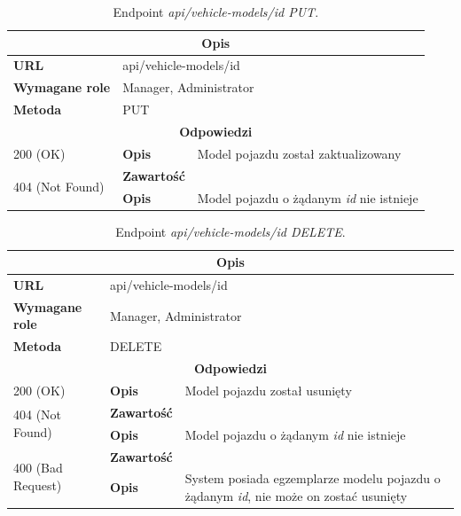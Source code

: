 \documentclass[eng,printmode,openany]{mgr}
\begin{document}
\begin{table}[H]
	\caption{Endpoint \textit{api/vehicle-models/id PUT}.}
	\begin{tabularx}{\textwidth}{|l|l|X|}
		\hline
		\multicolumn{3}{|c|}{\textbf{\textbf{Opis}}}
		\\ \hline
		\textbf{URL}                       & \multicolumn{2}{l|}{api/vehicle-models/id}
		\\ \hline
		\textbf{Wymagane role}             & \multicolumn{2}{l|}{Manager, Administrator}
		\\ \hline
		\textbf{Metoda}                    & \multicolumn{2}{l|}{PUT}
		\\ \hline
		\multicolumn{3}{|c|}{\textbf{Odpowiedzi}}
		\\ \hline
		200 (OK) 		 & \textbf{Opis}      	& Model pojazdu został zaktualizowany
		\\ \hline
		\multirow{2}{*}{404 (Not Found)} 	    & \textbf{Zawartość}     &   
		\\ \cline{2-3}                          & \textbf{Opis}          & Model pojazdu o żądanym \textit{id} nie istnieje
		\\ \hline
	\end{tabularx}
\end{table}

\begin{table}[H]
	\caption{Endpoint \textit{api/vehicle-models/id DELETE}.}
	\begin{tabularx}{\textwidth}{|l|l|X|}
		\hline
		\multicolumn{3}{|c|}{\textbf{\textbf{Opis}}}
		\\ \hline
		\textbf{URL}                       & \multicolumn{2}{l|}{api/vehicle-models/id}
		\\ \hline
		\textbf{Wymagane role}             & \multicolumn{2}{l|}{Manager, Administrator}
		\\ \hline
		\textbf{Metoda}                    & \multicolumn{2}{l|}{DELETE}
		\\ \hline
		\multicolumn{3}{|c|}{\textbf{Odpowiedzi}}
		\\ \hline
		200 (OK)			                & \textbf{Opis}         	& Model pojazdu został usunięty
		\\ \hline
		\multirow{2}{*}{404 (Not Found)} 	& \textbf{Zawartość}     &    	
		\\ \cline{2-3}                      & \textbf{Opis}          & Model pojazdu o żądanym \textit{id} nie istnieje
		\\ \hline
		\multirow{2}{*}{400 (Bad Request)} 	& \textbf{Zawartość}     &    	
		\\ \cline{2-3}                      & \textbf{Opis}          & System posiada egzemplarze modelu pojazdu o żądanym \textit{id}, nie może on zostać usunięty
		\\ \hline
	\end{tabularx}
\end{table}
\end{document}
